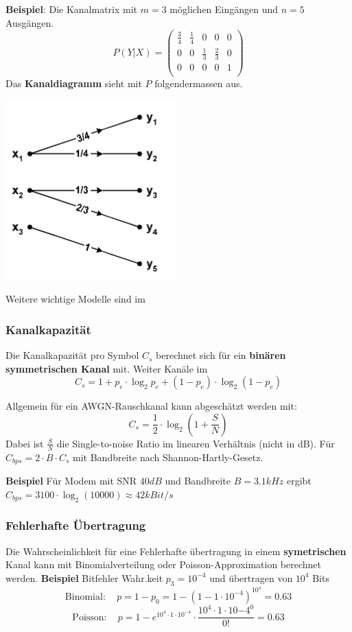 \noindent\textbf{Beispiel}: Die Kanalmatrix mit $m=3$ möglichen Eingängen und $n=5$ Ausgängen.
\[
P(Y|X) = \begin{pmatrix}
	\frac{3}{4} & \frac{1}{4} & 0 &0 &0 \\
	0 &0 &\frac{1}{3} & \frac{2}{3} &0 \\
	0 & 0 & 0 &0 &1 \\
\end{pmatrix}
\]
Das \textbf{Kanaldiagramm} sieht mit $P$ folgendermassen aus.
\begin{center}
	\includegraphics[width=0.3\columnwidth]{Images/kanaldiagramm}
\end{center}
Weitere wichtige Modelle sind im 

\subsubsection{Kanalkapazität}
Die Kanalkapazität pro Symbol $C_s$ berechnet sich für ein \textbf{binären symmetrischen Kanal} mit. Weiter Kanäle im 
\[
C_s = 1 + p_e\cdot \log_2p_e + (1 - p_e)\cdot\log_2(1- p_e)
\]

Allgemein für ein AWGN-Rauschkanal kann abgeschätzt werden mit:
\[
C_s = \frac{1}{2}\cdot \log_2\left(1 + \frac{S}{N}\right)
\]
Dabei ist $\frac{S}{N}$ die Single-to-noise Ratio im linearen Verhältnis (nicht in dB). Für $C_{bps} = 2\cdot B \cdot C_s$ mit Bandbreite nach Shannon-Hartly-Gesetz.

\noindent\textbf{Beispiel} Für Modem mit SNR $40dB$ und Bandbreite $B=3.1kHz$ ergibt $C_{bps} = 3100 \cdot \log_2(10000) \approx42kBit/s$

\subsubsection{Fehlerhafte Übertragung}
Die Wahrscheinlichkeit für eine Fehlerhafte übertragung in einem \textbf{symetrischen} Kanal kann mit Binomialverteilung oder Poisson-Approximation berechnet werden.
\noindent\textbf{Beispiel} Bitfehler Wahr.keit $p_3 = 10^{-4}$ und übertragen von $10^4$ Bits
\[
\text{Binomial}:\quad p = 1 - p_0 = 1 - (1 - 1 \cdot 10^{-4})^{10^4} = 0.63
\]
\[
\text{Poisson}:\quad p = 1 - e^{10^4\cdot1\cdot10^{-4}}\cdot \frac{10^4\cdot1\cdot10{-4}^0}{0!} = 0.63
\]
